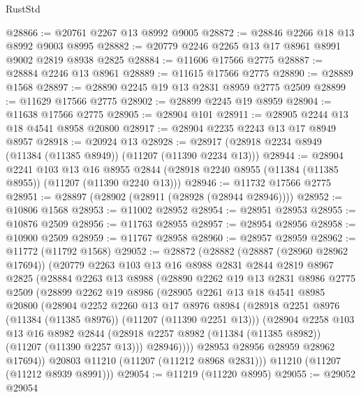 \begin{lexlean}{RustStd}
\begin{coremodule}
@28866 := @20761 @2267 @13 @8992 @9005
@28872 := @28846 @2266 @18 @13 @8992 @9003 @8995
@28882 := @20779 @2246 @2265 @13 @17 @8961 @8991 @9002 @2819 @8938 @2825
@28884 := @11606 @17566 @2775
@28887 := @28884 @2246 @13 @8961
@28889 := @11615 @17566 @2775
@28890 := @28889 @1568
@28897 := @28890 @2245 @19 @13 @2831 @8959 @2775 @2509
@28899 := @11629 @17566 @2775
@28902 := @28899 @2245 @19 @8959
@28904 := @11638 @17566 @2775
@28905 := @28904 @101
@28911 := @28905 @2244 @13 @18 @4541 @8958 @20800
@28917 := @28904 @2235 @2243 @13 @17 @8949 @8957
@28918 := @20924 @13
@28928 := @28917 (@28918 @2234 @8949 (@11384 (@11385 @8949)) (@11207 (@11390 @2234 @13)))
@28944 := @28904
    @2241
    @103
    @13
    @16
    @8955
    @2844
    (@28918 @2240 @8955 (@11384 (@11385 @8955)) (@11207 (@11390 @2240 @13)))
@28946 := @11732 @17566 @2775
@28951 := @28897 (@28902 (@28911 (@28928 (@28944 @28946))))
@28952 := @10806 @1568
@28953 := @11002 @28952
@28954 := @28951 @28953
@28955 := @10876 @2509
@28956 := @11763 @28955
@28957 := @28954 @28956
@28958 := @10900 @2509
@28959 := @11767 @28958
@28960 := @28957 @28959
@28962 := @11772 (@11792 @1568)
@29052 := @28872
    (@28882
      (@28887 (@28960 @28962 @17694))
      (@20779
        @2263
        @103
        @13
        @16
        @8988
        @2831
        @2844
        @2819
        @8967
        @2825
        (@28884
          @2263
          @13
          @8988
          (@28890
            @2262
            @19
            @13
            @2831
            @8986
            @2775
            @2509
            (@28899
              @2262
              @19
              @8986
              (@28905
                @2261
                @13
                @18
                @4541
                @8985
                @20800
                (@28904
                  @2252
                  @2260
                  @13
                  @17
                  @8976
                  @8984
                  (@28918 @2251 @8976 (@11384 (@11385 @8976)) (@11207 (@11390 @2251 @13)))
                  (@28904
                    @2258
                    @103
                    @13
                    @16
                    @8982
                    @2844
                    (@28918 @2257 @8982 (@11384 (@11385 @8982)) (@11207 (@11390 @2257 @13)))
                    @28946))))
            @28953
            @28956
            @28959
            @28962
            @17694))
        @20803
        @11210
        (@11207 (@11212 @8968 @2831)))
      @11210
      (@11207 (@11212 @8939 @8991)))
@29054 := @11219 (@11220 @8995)
@29055 := @29052 @29054

\end{coremodule}
\end{lexlean}
